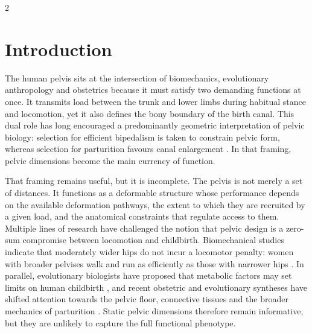 \documentclass[openacc]{rsproca_new}
\begin{document}
\begin{multicols}{2}

\section{Introduction}

The human pelvis sits at the intersection of biomechanics, evolutionary anthropology and obstetrics because it must satisfy two demanding functions at once. It transmits load between the trunk and lower limbs during habitual stance and locomotion, yet it also defines the bony boundary of the birth canal. This dual role has long encouraged a predominantly geometric interpretation of pelvic biology: selection for efficient bipedalism is taken to constrain pelvic form, whereas selection for parturition favours canal enlargement \cite{RosenbergTrevathan2002,Trevathan2015,Grunstra2023}. In that framing, pelvic dimensions become the main currency of function.

That framing remains useful, but it is incomplete. The pelvis is not merely a set of distances. It functions as a deformable structure whose performance depends on the available deformation pathways, the extent to which they are recruited by a given load, and the anatomical constraints that regulate access to them. Multiple lines of research have challenged the notion that pelvic design is a zero-sum compromise between locomotion and childbirth. Biomechanical studies indicate that moderately wider hips do not incur a locomotor penalty: women with broader pelvises walk and run as efficiently as those with narrower hips \cite{Warrener2015}. In parallel, evolutionary biologists have proposed that metabolic factors may set limits on human childbirth \cite{Dunsworth2012}, and recent obstetric and evolutionary syntheses have shifted attention towards the pelvic floor, connective tissues and the broader mechanics of parturition \cite{Pavlicev2020,Haeusler2021,Grunstra2023}. Static pelvic dimensions therefore remain informative, but they are unlikely to capture the full functional phenotype.


\end{multicols}
\end{document}
